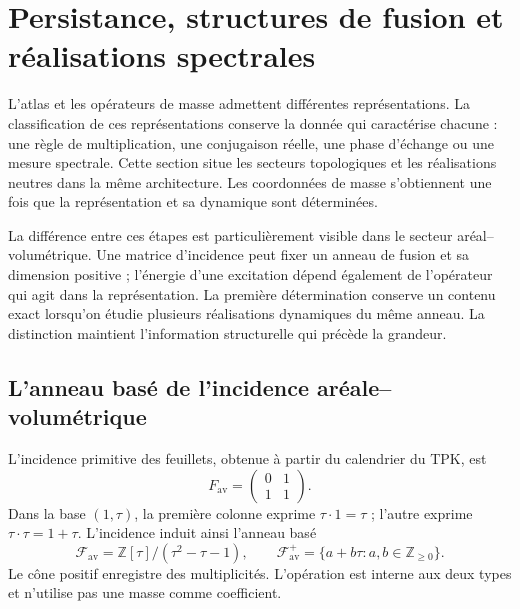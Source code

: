 \section{Persistance, structures de fusion et réalisations spectrales}
\label{vi:vi:sec:topologia}

L’atlas et les opérateurs de masse admettent différentes représentations. La
classification de ces représentations conserve la donnée qui caractérise
chacune : une règle de multiplication, une conjugaison réelle, une phase
d’échange ou une mesure spectrale. Cette section situe les secteurs
topologiques et les réalisations neutres dans la même architecture.
Les coordonnées de masse s’obtiennent une fois que la représentation et sa
dynamique sont déterminées.

La différence entre ces étapes est particulièrement visible dans le secteur
aréal--volumétrique. Une matrice d’incidence peut fixer un anneau de fusion
et sa dimension positive ; l’énergie d’une excitation dépend également de
l’opérateur qui agit dans la représentation. La première détermination conserve
un contenu exact lorsqu’on étudie plusieurs réalisations dynamiques
du même anneau. La distinction maintient l’information structurelle qui
précède la grandeur.

\subsection{L’anneau basé de l’incidence aréale--volumétrique}
\label{vi:vi:subsec:fusion-av}

L’incidence primitive des feuillets, obtenue à partir du calendrier du TPK, est
\[
 F_{\mathrm{av}}=\begin{pmatrix}0&1\\1&1\end{pmatrix}.
\]
Dans la base $(1,\tau)$, la première colonne exprime
$\tau\cdot1=\tau$ ; l’autre exprime $\tau\cdot\tau=1+\tau$.
L’incidence induit ainsi l’anneau basé
\[
 \mathcal F_{\mathrm{av}}=\mathbb Z[\tau]/(\tau^2-\tau-1),
 \qquad \mathcal F_{\mathrm{av}}^+
 =\{a+b\tau:a,b\in\mathbb Z_{\geq0}\}.
\]
Le cône positif enregistre des multiplicités. L’opération est interne aux
deux types et n’utilise pas une masse comme coefficient.


